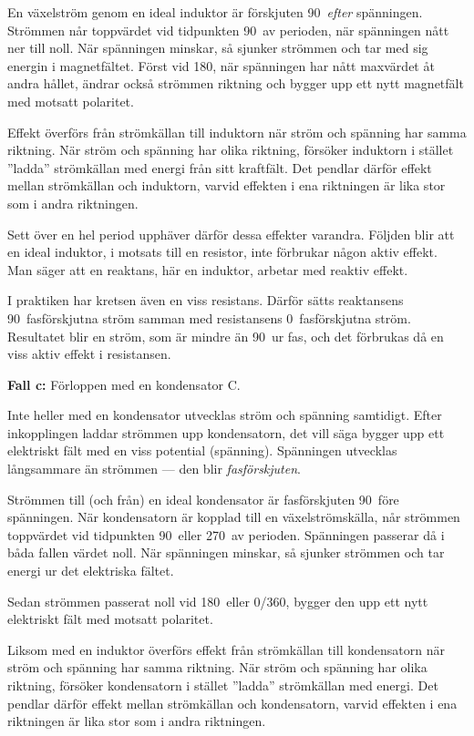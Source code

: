 En växelström genom en ideal induktor är förskjuten 90\degree\ \emph{efter}
spänningen.
Strömmen når toppvärdet vid tidpunkten 90\degree\ av perioden, när spänningen
nått ner till noll.
När spänningen minskar, så sjunker strömmen och tar med sig energin i
magnetfältet.
Först vid 180\degree, när spänningen har nått maxvärdet åt andra hållet, ändrar
också strömmen riktning och bygger upp ett nytt magnetfält med motsatt
polaritet.

Effekt överförs från strömkällan till induktorn när ström och spänning har
samma riktning.
När ström och spänning har olika riktning, försöker induktorn i stället
''ladda'' strömkällan med energi från sitt kraftfält.
Det pendlar därför effekt mellan strömkällan och induktorn, varvid effekten i
ena riktningen är lika stor som i andra riktningen.

Sett över en hel period upphäver därför dessa effekter varandra.
Följden blir att en ideal induktor, i motsats till en resistor, inte förbrukar
någon aktiv effekt.
Man säger att en reaktans, här en induktor, arbetar med reaktiv effekt.

I praktiken har kretsen även en viss resistans.
Därför sätts reaktansens 90\degree~fasförskjutna ström samman med resistansens
0\degree~fasförskjutna ström.
Resultatet blir en ström, som är mindre än 90\degree~ur fas, och det förbrukas
då en viss aktiv effekt i resistansen.

\noindent \textbf{Fall c:} Förloppen med en kondensator C.

Inte heller med en kondensator utvecklas ström och spänning samtidigt.
Efter inkopplingen laddar strömmen upp kondensatorn, det vill säga bygger upp ett
elektriskt fält med en viss potential (spänning).
Spänningen utvecklas långsammare än strömmen --- den blir \emph{fasförskjuten}.

Strömmen till (och från) en ideal kondensator är fasförskjuten 90\degree~före
spänningen.
När kondensatorn är kopplad till en växelströmskälla, når strömmen toppvärdet
vid tidpunkten 90\degree\ eller 270\degree\ av perioden.
Spänningen passerar då i båda fallen värdet noll.
När spänningen minskar, så sjunker strömmen och tar energi ur det elektriska
fältet.

Sedan strömmen passerat noll vid 180\degree\ eller 0\degree/360\degree, bygger
den upp ett nytt elektriskt fält med motsatt polaritet.

Liksom med en induktor överförs effekt från strömkällan till kondensatorn när
ström och spänning har samma riktning.
När ström och spänning har olika riktning, försöker kondensatorn i stället
''ladda'' strömkällan med energi.
Det pendlar därför effekt mellan strömkällan och kondensatorn, varvid effekten i
ena riktningen är lika stor som i andra riktningen.

